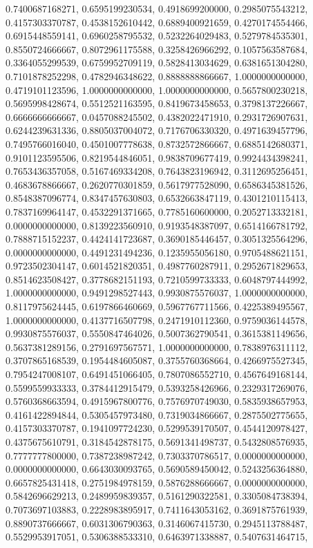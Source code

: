 {{0.7400687168271, 0.6595199230534, 0.4918699200000, 0.2985075543212, 0.4157303370787, 0.4538152610442, 0.6889400921659, 0.4270174554466, 0.6915448559141, 0.6960258795532},
{0.5232264029483, 0.5279784535301, 0.8550724666667, 0.8072961175588, 0.3258426966292, 0.1057563587684, 0.3364055299539, 0.6759952709119, 0.5828413034629, 0.6381651304280},
{0.7101878252298, 0.4782946348622, 0.8888888866667, 1.0000000000000, 0.4719101123596, 1.0000000000000, 1.0000000000000, 0.5657800230218, 0.5695998428674, 0.5512521163595},
{0.8419673458653, 0.3798137226667, 0.6666666666667, 0.0457088245502, 0.4382022471910, 0.2931726907631, 0.6244239631336, 0.8805037004072, 0.7176706330320, 0.4971639457796},
{0.7495766016040, 0.4501007778638, 0.8732572866667, 0.6885142680371, 0.9101123595506, 0.8219544846051, 0.9838709677419, 0.9924434398241, 0.7653436357058, 0.5167469334208},
{0.7643823196942, 0.3112695256451, 0.4683678866667, 0.2620770301859, 0.5617977528090, 0.6586345381526, 0.8548387096774, 0.8347457630803, 0.6532663847119, 0.4301210115413},
{0.7837169964147, 0.4532291371665, 0.7785160600000, 0.2052713332181, 0.0000000000000, 0.8139223560910, 0.9193548387097, 0.6514166781792, 0.7888715152237, 0.4424141723687},
{0.3690185446457, 0.3051325564296, 0.0000000000000, 0.4491231494236, 0.1235955056180, 0.9705488621151, 0.9723502304147, 0.6014521820351, 0.4987760287911, 0.2952671829653},
{0.8514623508427, 0.3778682151193, 0.7210599733333, 0.6048797444992, 1.0000000000000, 0.9491298527443, 0.9930875576037, 1.0000000000000, 0.8117975624445, 0.6197866460669},
{0.5967767711566, 0.4225389495567, 1.0000000000000, 0.4137716507798, 0.2471910112360, 0.9759036144578, 0.9930875576037, 0.5550847464026, 0.5007362790541, 0.3615381149656},
{0.5637381289156, 0.2791697567571, 1.0000000000000, 0.7838976311112, 0.3707865168539, 0.1954484605087, 0.3755760368664, 0.4266975527345, 0.7954247008107, 0.6491451066405},
{0.7807086552710, 0.4567649168144, 0.5599559933333, 0.3784412915479, 0.5393258426966, 0.2329317269076, 0.5760368663594, 0.4915967800776, 0.7576970749030, 0.5835938657953},
{0.4161422894844, 0.5305457973480, 0.7319034866667, 0.2875502775655, 0.4157303370787, 0.1941097724230, 0.5299539170507, 0.4544120978427, 0.4375675610791, 0.3184542878175},
{0.5691341498737, 0.5432808576935, 0.7777777800000, 0.7387238987242, 0.7303370786517, 0.0000000000000, 0.0000000000000, 0.6643030093765, 0.5690589450042, 0.5243256364880},
{0.6657825431418, 0.2751984978159, 0.5876288666667, 0.0000000000000, 0.5842696629213, 0.2489959839357, 0.5161290322581, 0.3305084738394, 0.7073697103883, 0.2228983895917},
{0.7411643053162, 0.3691875761939, 0.8890737666667, 0.6031306790363, 0.3146067415730, 0.2945113788487, 0.5529953917051, 0.5306388533310, 0.6463971338887, 0.5407631464715},
}
